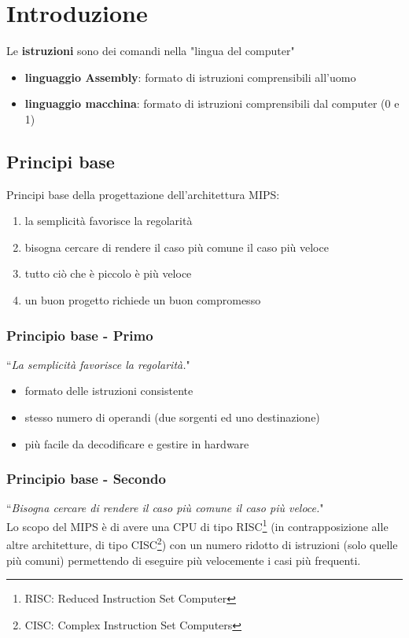 \documentclass[../main.tex]{subfiles}
\begin{document}
\chapter{Introduzione}
Le \textbf{istruzioni} sono dei comandi nella "lingua del computer"
\begin{itemize}
    \item \textbf{linguaggio Assembly}: formato di istruzioni comprensibili all'uomo
    \item \textbf{linguaggio macchina}: formato di istruzioni comprensibili dal computer (0 e 1)
\end{itemize}

\section{Principi base}
Principi base della progettazione dell'architettura MIPS:
\begin{enumerate}
    \item la semplicità favorisce la regolarità
    \item bisogna cercare di rendere il caso più comune il caso più veloce
    \item tutto ciò che è piccolo è più veloce
    \item un buon progetto richiede un buon compromesso
\end{enumerate}

\subsection*{Principio base - \Large Primo}
``\textit{La semplicità favorisce la regolarità.}"
\begin{itemize}
    \item formato delle istruzioni consistente
    \item stesso numero di operandi (due sorgenti ed uno destinazione)
    \item più facile da decodificare e gestire in hardware
\end{itemize}

\subsection*{Principio base - \Large Secondo}
``\textit{Bisogna cercare di rendere il caso più comune il caso più veloce.}"
\\[2mm] Lo scopo del MIPS è di avere una CPU di tipo
RISC\hspace*{.25mm}\footnote{\hspace*{.5mm}RISC:
Reduced Instruction Set Computer}
(in contrapposizione alle altre architetture, di tipo
CISC\hspace*{.25mm}\footnote{\hspace*{.5mm}CISC:
Complex Instruction Set Computers})
con un numero ridotto di istruzioni (solo quelle più comuni)
permettendo di eseguire più velocemente i casi più frequenti.
\end{document}
